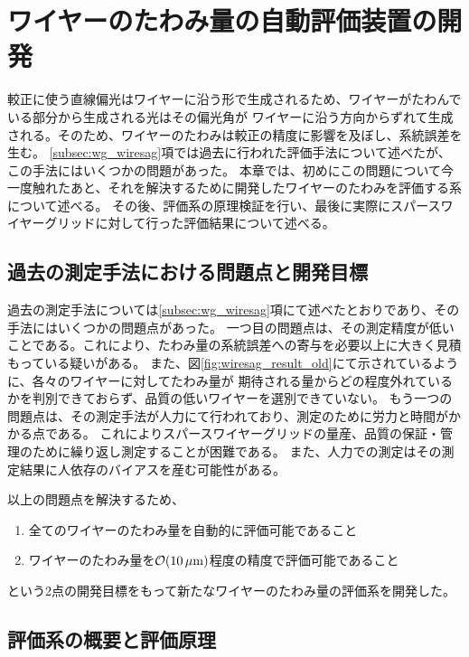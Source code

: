 \documentclass[../../main.tex]{subfiles}
\begin{document}
\chapter{ワイヤーのたわみ量の自動評価装置の開発}
\label{chap:wiresag}
較正に使う直線偏光はワイヤーに沿う形で生成されるため、ワイヤーがたわんでいる部分から生成される光はその偏光角が
ワイヤーに沿う方向からずれて生成される。そのため、ワイヤーのたわみは較正の精度に影響を及ぼし、系統誤差を生む。
\ref{subsec:wg_wiresag}項では過去に行われた評価手法について述べたが、この手法にはいくつかの問題があった。
本章では、初めにこの問題について今一度触れたあと、それを解決するために開発したワイヤーのたわみを評価する系について述べる。
その後、評価系の原理検証を行い、最後に実際にスパースワイヤーグリッドに対して行った評価結果について述べる。

\section{過去の測定手法における問題点と開発目標}
過去の測定手法については\ref{subsec:wg_wiresag}項にて述べたとおりであり、その手法にはいくつかの問題点があった。
一つ目の問題点は、その測定精度が低いことである。これにより、たわみ量の系統誤差への寄与を必要以上に大きく見積もっている疑いがある。
また、図\ref{fig:wiresag_result_old}にて示されているように、各々のワイヤーに対してたわみ量が
期待される量からどの程度外れているかを判別できておらず、品質の低いワイヤーを選別できていない。
もう一つの問題点は、その測定手法が人力にて行われており、測定のために労力と時間がかかる点である。
これによりスパースワイヤーグリッドの量産、品質の保証・管理のために繰り返し測定することが困難である。
また、人力での測定はその測定結果に人依存のバイアスを産む可能性がある。

以上の問題点を解決するため、
\begin{enumerate}
    \item 全てのワイヤーのたわみ量を自動的に評価可能であること
    \item ワイヤーのたわみ量を$\order{\SI{10}{\mu m}}$程度の精度で評価可能であること
\end{enumerate}
という2点の開発目標をもって新たなワイヤーのたわみ量の評価系を開発した。

\section{評価系の概要と評価原理}
\end{document}
